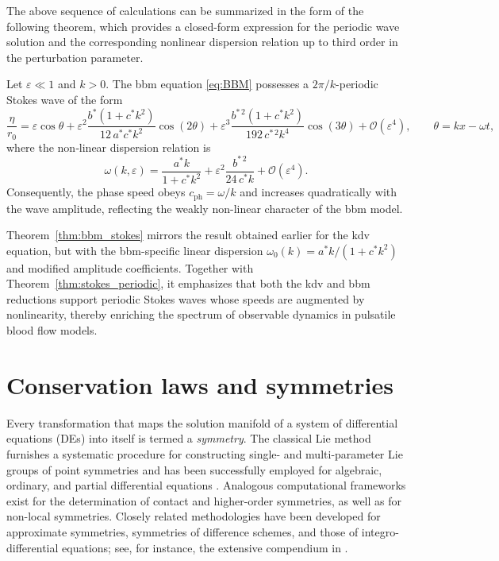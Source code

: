 \documentclass[alpha-refs, 12pt]{wiley-article}
\renewcommand{\O}{\mathcal{O}}
\newcommand{\eps}{\varepsilon}
\begin{document}
The above sequence of calculations can be summarized in the form of the following theorem, which provides a closed-form expression for the periodic wave solution and the corresponding nonlinear dispersion relation up to third order in the perturbation parameter.
\begin{theorem}\label{thm:bbm_stokes}
Let $\eps\ll1$ and $k>0$. The \acrshort{bbm} equation \eqref{eq:BBM} possesses a $2\pi/k$-periodic Stokes wave of the form
\begin{equation}\label{eq:bbm_eta_series}
  \frac{\eta}{r_{0}}
  =\eps\cos\theta
   +\eps^{2}
      \frac{b^{\ast}(1+c^{\ast}k^{2})}{12\,a^{\ast}c^{\ast}k^{2}}
      \cos(2\theta)
   +\eps^{3}
      \frac{b^{\ast\,2}(1+c^{\ast}k^{2})}{192\,c^{\ast\,2}k^{4}}
      \cos(3\theta)
   +\O(\eps^{4}), \qquad \theta=kx-\omega t,
  \end{equation}
where the non‐linear dispersion relation is
\begin{equation}\label{eq:bbm_dispersion}
  \omega(k,\eps)
  =\frac{a^{\ast}k}{1+c^{\ast}k^{2}}
   +\eps^{2}\frac{b^{\ast\,2}}{24\,c^{\ast}k}
   +\O(\eps^{4}).
\end{equation}
Consequently, the phase speed obeys
\(
  c_{\mathrm{ph}}=\omega/k
\)
and increases quadratically with the wave amplitude, reflecting the weakly non-linear character of the \acrshort{bbm} model.
\end{theorem}

Theorem~\ref{thm:bbm_stokes} mirrors the result obtained earlier for the \acrshort{kdv} equation, but with the \acrshort{bbm}-specific linear dispersion
\(
  \omega_{0}(k)=a^{\ast}k/(1+c^{\ast}k^{2})
\)
and modified amplitude coefficients. Together with Theorem~\ref{thm:stokes_periodic}, it emphasizes that both the \acrshort{kdv} and \acrshort{bbm} reductions support periodic Stokes waves whose speeds are augmented by nonlinearity, thereby enriching the spectrum of observable dynamics in pulsatile blood flow models.

\section{Conservation laws and symmetries}
\label{sec:cons_sym}

Every transformation that maps the solution manifold of a system of differential equations (DEs) into itself is termed a \emph{symmetry}. The classical Lie method furnishes a systematic procedure for constructing single- and multi-parameter Lie groups of point symmetries and has been successfully employed for algebraic, ordinary, and partial differential equations \cite{Cheviakov2007}. Analogous computational frameworks exist for the determination of contact and higher-order symmetries, as well as for non-local symmetries. Closely related methodologies have been developed for approximate symmetries, symmetries of difference schemes, and those of integro-differential equations; see, for instance, the extensive compendium in \cite{Ibragimov1995}.
\end{document}
